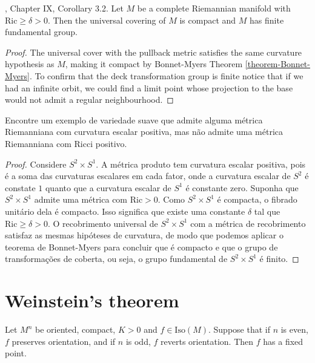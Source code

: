 \documentclass{book}
\begin{document}
\begin{lemma}
\label{lemma-bonne-myers-impli-compa-unive}
\cite{doc}, Chapter IX, Corollary 3.2. Let
$M$ be a complete Riemannian manifold
with $\text{Ric}\geq \delta>0$. Then the
universal covering of $M$ is compact
and $M$ has finite fundamental group.
\end{lemma}

\begin{proof}

The universal cover with the pullback metric
satisfies the same curvature
hypothesis as $M$, making it compact by
Bonnet-Myers Theorem
\ref{theorem-Bonnet-Myers}. To confirm that
the deck transformation group is
finite notice that if we had an infinite
orbit, we could find a limit point
whose projection to the base would not admit
a regular neighbourhood.
\end{proof}


\begin{exercise}[Exercício 3]
\label{exercise-posit-scala-but-no-posit}
Encontre um exemplo de variedade suave que
admite alguma métrica Riemanniana com
curvatura escalar positiva, mas não admite
uma métrica Riemanniana com Ricci
positivo.
\end{exercise}

\begin{proof}
Considere $S^2\times S^1$. A métrica produto
tem curvatura escalar positiva,
pois é a soma das curvaturas escalares em
cada fator, onde a curvatura escalar
de $S^2$ é constate $1$ quanto que a
curvatura escalar de $S^1$ é constante
zero. Suponha que $S^2\times S^1$ admite uma
métrica com $\text{Ric}>0$. Como
$S^2\times S^1$ é compacta, o fibrado
unitário dela é compacto. Isso significa
que existe uma constante $\delta$ tal que
$\text{Ric}\geq \delta>0$. O
recobrimento universal de $S^2 \times S^1$
com a métrica de
recobrimento satisfaz as mesmas hipóteses de
curvatura, de modo que podemos
aplicar o teorema de Bonnet-Myers para
concluir que é compacto e que o grupo de
transformações de coberta, ou seja, o grupo
fundamental de $S^2\times S^1$ é
finito.
\end{proof}

\section{Weinstein's theorem}
\label{section-Weinstein-theorem}

\begin{theorem}[Weinstein]
\label{theorem-Weinstein}
Let $M^n$ be oriented, compact, $K>0$ and $f
\in \text{Iso}(M)$. Suppose that
if $n$ is even, $f$ preserves orientation,
and if $n$ is odd, $f$ reverts
orientation. Then $f$ has a fixed point.
\end{theorem}
\end{document}
